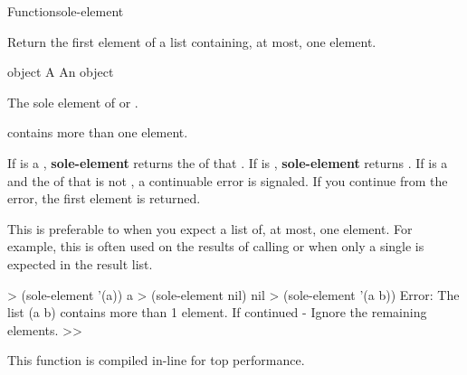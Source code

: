 \documentclass[10pt,twoside,english,pdftex]{article}
\newcommand{\inline}{This function is compiled in-line for top performance.}
\begin{document}
\begin{functiondoc}{Function}{sole-element}{
    \returns{} } 
%
%
  
\fnsyntax

\fnpurpose Return the first element of a list containing, at most, one element.

\fnpackage {}

\fnmodule {}

\fnargs
\begin{args}{object}
\arg[list] A 
\arg[element] An object
\end{args}

\fnreturns The sole element of  or \nil.

\fnerrors
{} contains more than one element.

\fndescription If  is a , \textbf{sole-element}
returns the  of that . If  is \nil,
\textbf{sole-element} returns \nil.  If  is a  and the
 of that  is not \nil, a continuable error is
signaled.  If you continue from the error, the first element is returned.

%
%
This  is preferable to \textbf{} when you expect a
list of, at most, one element.  For example, this  is often
used on the results of calling \textbf{} or
\textbf{} when only a single
 is expected in the result list.

\fnexamples
%
\W\supp
\begin{example}
  > (sole-element '(a))
  a
  > (sole-element nil)
  nil\goodpagebreak
  > (sole-element '(a b))
  Error: The list (a b) contains more than 1 element.
         If continued - Ignore the remaining elements.
  >>
\end{example}

\fnnote \inline

\end{functiondoc}

\end{document}

